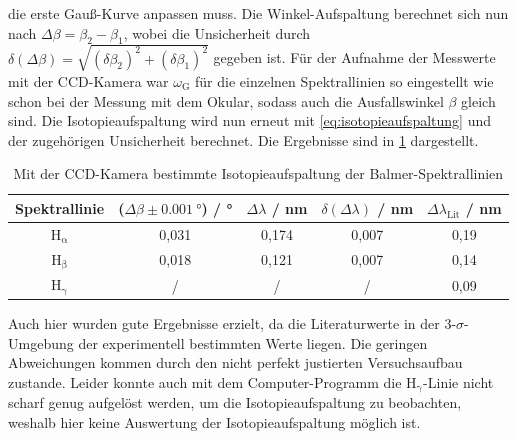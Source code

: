 die erste Gauß-Kurve anpassen muss.\newline
\indent Die Winkel-Aufspaltung berechnet sich nun nach $\Delta \beta = \beta_2 - \beta_1$, wobei die Unsicherheit durch $\delta (\Delta \beta) = \sqrt{(\delta \beta_2)^2 + (\delta \beta_1)^2}$
gegeben ist. Für der Aufnahme der Messwerte mit der CCD-Kamera war $\omega_{\mathrm{G}}$ für die einzelnen Spektrallinien so eingestellt wie schon bei der Messung mit dem Okular, sodass auch die Ausfallswinkel $\beta$ gleich sind.
Die Isotopieaufspaltung wird nun erneut mit \ref{eq:isotopieaufspaltung} und der zugehörigen Unsicherheit berechnet. Die Ergebnisse sind in \cref{tab:aufspaltung_balmer_2} dargestellt.
\begin{table}[H]
    \centering
    \caption{Mit der CCD-Kamera bestimmte Isotopieaufspaltung der Balmer-Spektrallinien}
    \begin{tabular}{c|c|c|c|c}
        Spektrallinie & ($\Delta \beta \pm \SI{0,001}{\degree}$) / \unit{\degree} & $\Delta \lambda$ / \unit{\nano \meter} & $\delta (\Delta \lambda)$ / \unit{\nano \meter} & $\Delta \lambda_{\mathrm{Lit}}$ / \unit{\nano \meter} \\
        \hline
        $\mathrm{H_{\alpha}}$ & 0,031 & 0,174 & 0,007 & 0,19 \\
        $\mathrm{H_{\beta}}$ & 0,018 & 0,121 & 0,007 & 0,14 \\
        $\mathrm{H_{\gamma}}$ & / & / & / & 0,09
    \end{tabular}\label{tab:aufspaltung_balmer_2}
\end{table} Auch hier wurden gute Ergebnisse erzielt, da die Literaturwerte in der 3-$\sigma$-Umgebung der experimentell bestimmten Werte liegen. Die geringen Abweichungen kommen durch
den nicht perfekt justierten Versuchsaufbau zustande. Leider konnte auch mit dem Computer-Programm die $\mathrm{H_{\gamma}}$-Linie nicht scharf genug aufgelöst werden, um
die Isotopieaufspaltung zu beobachten, weshalb hier keine Auswertung der Isotopieaufspaltung möglich ist.

